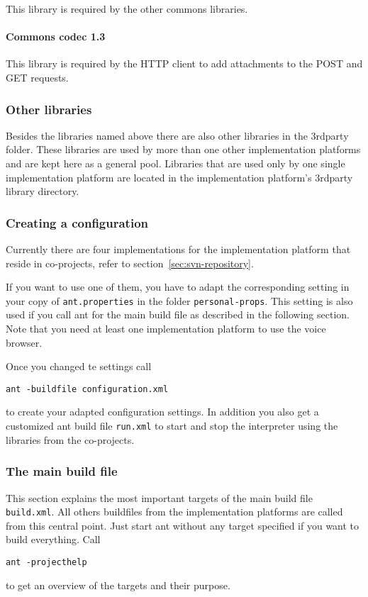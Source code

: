 \documentclass[11pt,a4paper]{article}
\begin{document}
This library is required by the other commons libraries.

\paragraph{Commons codec 1.3}
\label{sec:commons-logging}

This library is required by the HTTP client to add attachments to the POST and
GET requests.

\subsubsection{Other libraries}

Besides the libraries named above there are also other libraries in the
3rdparty folder. These libraries are used by more than one other implementation
platforms and are kept here as a general pool. Libraries that are used only by
one single implementation platform are located in the implementation platform's
3rdparty library directory.


\subsubsection{Creating a configuration}

Currently there are four implementations for the implementation platform
that reside in co-projects, refer to section~\ref{sec:svn-repository}.

If you want to use one of them, you have to adapt the corresponding setting
in your copy of \texttt{ant.properties} in the folder \texttt{personal-props}.
This setting is also used if you call ant for the main build file as described
in the following section.
Note that you need at least one implementation platform to use the voice
browser.

Once you changed te settings call
\begin{lstlisting}
ant -buildfile configuration.xml
\end{lstlisting}
to create your adapted configuration settings. In addition you also get
a customized ant build file \texttt{run.xml} to start and stop the interpreter
using the libraries from the co-projects.

\subsubsection{The main build file}

This section explains the most important targets of the main build file
\texttt{build.xml}. All others buildfiles from the implementation platforms
are called from this central point. Just start ant without any target specified
if you want to build everything. Call
\begin{lstlisting}
ant -projecthelp
\end{lstlisting}
to get an overview of the targets and their purpose.
\end{document}
